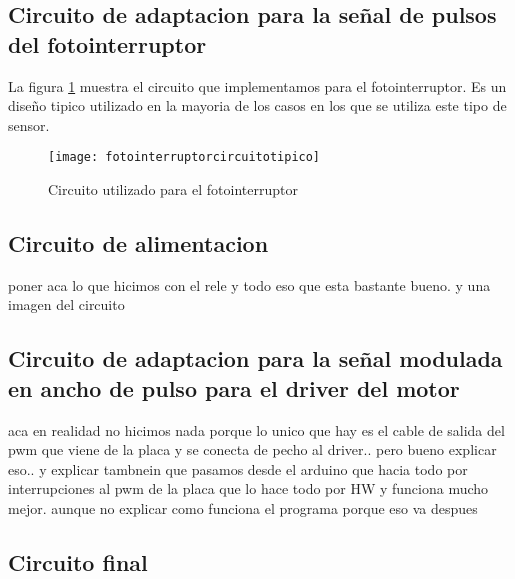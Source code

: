 \subsection{Circuito de adaptacion para la señal de pulsos del fotointerruptor} %
\label{sub:circuito_de_adaptacion_para_la_señal_de_pulsos_del_fotointerruptor}

La figura \ref{fig:fotointerruptorcircuitotipico} muestra el circuito que implementamos para el fotointerruptor. Es un diseño tipico utilizado en la mayoria de los casos en los que se utiliza este tipo de sensor. 

\begin{figure}[h]
  \centering
  \texttt{[image: fotointerruptorcircuitotipico]}
  \caption{Circuito utilizado para el fotointerruptor}\label{fig:fotointerruptorcircuitotipico}
\end{figure}


\subsection{Circuito de alimentacion} %
\label{sub:circuito_de_alimentacion}

poner aca lo que hicimos con el rele y todo eso que esta bastante bueno. y una imagen del circuito


\subsection{Circuito de adaptacion para la señal modulada en ancho de pulso para el driver del motor} %
\label{sub:circuito_de_adaptacion_para_la_señal_modulada_en_ancho_de_pulso_para_el_driver_del_motor}

aca en realidad no hicimos nada porque lo unico que hay es el cable de salida del pwm que viene de la placa y se conecta de pecho al driver.. pero bueno explicar eso.. y explicar tambnein que pasamos desde el arduino que hacia todo por interrupciones al pwm de la placa que lo hace todo por HW y funciona mucho mejor. aunque no explicar como funciona el programa porque eso va despues


\subsection{Circuito final} %
\label{sub:circuito_final}


